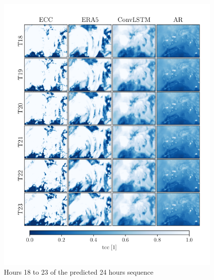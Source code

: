 \begin{figure}[ht]
    \centering
    \includegraphics{python_figs/comparing_seq_part_4_of4_jan2.png}
    \caption{Hours 18 to 23 of the predicted 24 hours sequence }
    \label{fig:part4/4}
\end{figure}

\cleardoublepage


